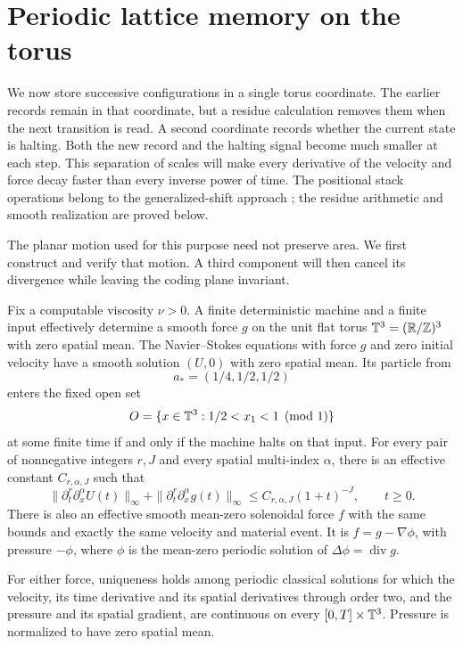 \section{Periodic lattice memory on the torus}
\label{sec:lattice}

We now store successive configurations in a single torus coordinate.
The earlier records remain in that coordinate, but a residue calculation
removes them when the next transition is read.  A second coordinate
records whether the current state is halting.  Both the new record and
the halting signal become much smaller at each step.  This separation of
scales will make every derivative of the velocity and force decay faster
than every inverse power of time. The positional stack operations belong
to the generalized-shift approach \cite{Moore}; the residue arithmetic
and smooth realization are proved below.

The planar motion used for this purpose need not preserve area.  We
first construct and verify that motion.  A third component will then
cancel its divergence while leaving the coding plane invariant.

\begin{theorem}\label{thm:lattice}
Fix a computable viscosity $\nu>0$.  A finite deterministic machine and
a finite input effectively determine a smooth force $g$ on the unit
flat torus $\mathbb T^3=(\mathbb R/\mathbb Z)^3$ with zero spatial mean.  The
Navier--Stokes equations with force $g$ and zero initial velocity have
a smooth solution $(U,0)$ with zero spatial mean.  Its particle from
\[
 a_*=(1/4,1/2,1/2)
\]
enters the fixed open set
\[
 O=\{x\in\mathbb T^3:1/2<x_1<1\pmod 1\}
\]
at some finite time if and only if the machine halts on that input.
For every pair of nonnegative integers $r,J$ and every spatial
multi-index $\alpha$, there is an effective constant $C_{r,\alpha,J}$
such that
\begin{equation}\label{eq:lattice-rapid}
 \|\partial_t^r\partial_x^\alpha U(t)\|_\infty
 +\|\partial_t^r\partial_x^\alpha g(t)\|_\infty
 \le C_{r,\alpha,J}(1+t)^{-J},\qquad t\ge0.
\end{equation}
There is also an effective smooth mean-zero solenoidal force $f$
with the same bounds and exactly the same velocity and material event.
It is $f=g-\nabla\phi$, with pressure $-\phi$, where $\phi$ is the
mean-zero periodic solution of $\Delta\phi=\operatorname{div}g$.

For either force, uniqueness holds among periodic classical solutions
for which the velocity, its time derivative and its spatial derivatives
through order two, and the pressure and its spatial gradient, are
continuous on every $[0,T]\times\mathbb T^3$.  Pressure is normalized to have
zero spatial mean.
\end{theorem}

